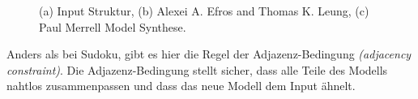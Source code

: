 \documentclass[12pt, a4paper,twoside,openright]{report} %
\begin{document}
\begin{figure}[H]
    \centering
    \qquad
    \qquad
    \caption{(a) Input Struktur, (b) Alexei A. Efros and Thomas K. Leung, (c) Paul Merrell Model Synthese. \cite{merrell2009model}}%
\end{figure}

Anders als bei Sudoku, gibt es hier die Regel der Adjazenz-Bedingung \textit{(adjacency constraint)}.
Die Adjazenz-Bedingung stellt sicher, dass alle Teile des Modells nahtlos zusammenpassen und dass das neue Modell dem Input ähnelt.
\end{document}
